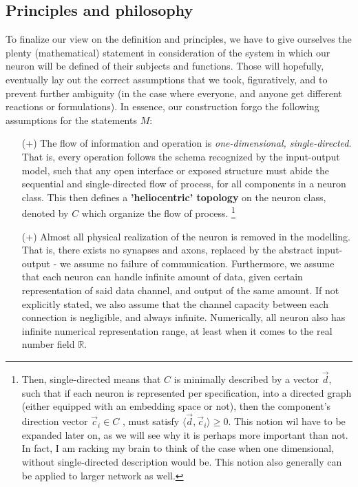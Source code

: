 \subsection{Principles and philosophy}
To finalize our view on the definition and principles, we have to give ourselves the plenty (mathematical) statement in consideration of the system in which our neuron will be defined of their subjects and functions. Those will hopefully, eventually lay out the correct assumptions that we took, figuratively, and to prevent further ambiguity (in the case where everyone, and anyone get different reactions or formulations). In essence, our construction forgo the following assumptions for the statements $M$:

\begin{itemize}[itemsep=1pt, topsep=3pt,leftmargin=4pt]
    \item[(+)] The flow of information and operation is \textit{one-dimensional, single-directed}. That is, every operation follows the schema recognized by the input-output model, such that any open interface or exposed structure must abide the sequential and single-directed flow of process, for all components in a neuron class. This then defines a \textbf{'heliocentric' topology}  on the neuron class, denoted by $C$ which organize the flow of process. \footnote{Then, single-directed means that $C$ is minimally described by a vector $\vec{d}$, such that if each neuron is represented per specification, into a directed graph (either equipped with an embedding space or not), then the component's direction vector $\vec{c}_{i}\in C$ , must satisfy $\langle \vec{d},\vec{c}_{i}\rangle \geq 0$. This notion wil have to be expanded later on, as we will see why it is perhaps more important than not. In fact, I am racking my brain to think of the case when one dimensional, without single-directed description would be. This notion also generally can be applied to larger network as well.}
    \item[(+)] Almost all physical realization of the neuron is removed in the modelling. That is, there exists no synapses and axons, replaced by the abstract input-output - we assume no failure of communication. Furthermore, we assume that each neuron can handle infinite amount of data, given certain representation of said data channel, and output of the same amount. If not explicitly stated, we also assume that the channel capacity between each connection is negligible, and always infinite. Numerically, all neuron also has infinite numerical representation range, at least when it comes to the real number field $\mathbb{R}$. 

\end{itemize}
